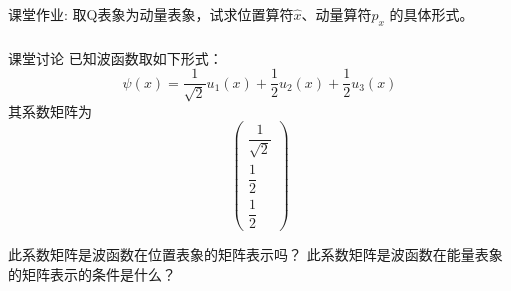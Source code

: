 \begin{frame} 
    \frametitle{}
    \begin{exampleblock}{课堂作业:}
    取Q表象为动量表象，试求位置算符$\hat{x}$、动量算符$\hat{p}_x$ 的具体形式。
    \end{exampleblock}
\end{frame} 

\begin{frame} 
    \frametitle{}
    \begin{tcolorbox2}{课堂讨论}
    已知波函数取如下形式：$$\psi(x)=\dfrac{1}{\sqrt{2}}u_1(x)+\dfrac{1}{2}u_2(x)+\dfrac{1}{2}u_3(x)$$
    其系数矩阵为$$\begin{pmatrix}
            \dfrac{1}{\sqrt{2}}\\
            \dfrac{1}{2}\\
            \dfrac{1}{2}
            \end{pmatrix}$$
    \begin{enumerate}
        \Item  此系数矩阵是波函数在位置表象的矩阵表示吗？
        \Item  此系数矩阵是波函数在能量表象的矩阵表示的条件是什么？  
    \end{enumerate}
    \end{tcolorbox2}
\end{frame} 
